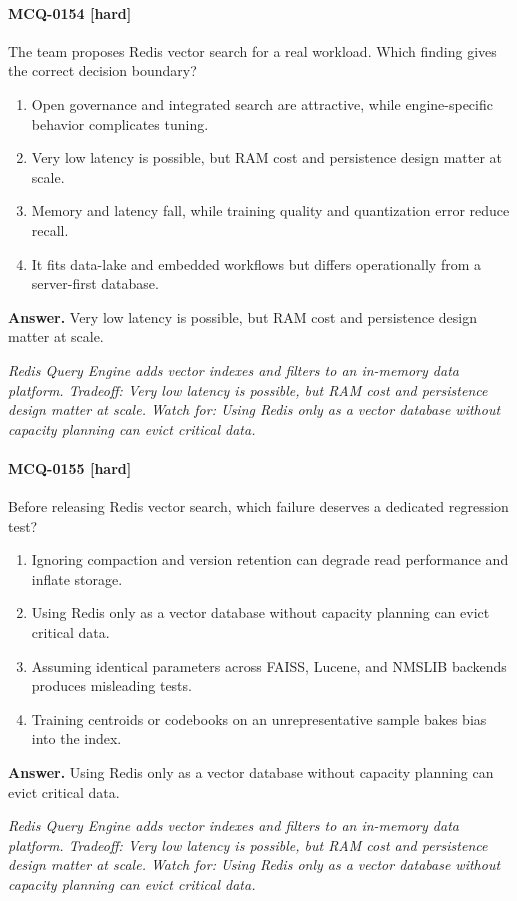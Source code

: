 \paragraph{MCQ-0154 [hard]} The team proposes Redis vector search for a real workload. Which finding gives the correct decision boundary?
\begin{enumerate}[label=\Alph*.]
\item Open governance and integrated search are attractive, while engine-specific behavior complicates tuning.
\item Very low latency is possible, but RAM cost and persistence design matter at scale.
\item Memory and latency fall, while training quality and quantization error reduce recall.
\item It fits data-lake and embedded workflows but differs operationally from a server-first database.
\end{enumerate}
\noindent\textbf{Answer.} Very low latency is possible, but RAM cost and persistence design matter at scale.
\par\textit{Redis Query Engine adds vector indexes and filters to an in-memory data platform. Tradeoff: Very low latency is possible, but RAM cost and persistence design matter at scale. Watch for: Using Redis only as a vector database without capacity planning can evict critical data.}
\paragraph{MCQ-0155 [hard]} Before releasing Redis vector search, which failure deserves a dedicated regression test?
\begin{enumerate}[label=\Alph*.]
\item Ignoring compaction and version retention can degrade read performance and inflate storage.
\item Using Redis only as a vector database without capacity planning can evict critical data.
\item Assuming identical parameters across FAISS, Lucene, and NMSLIB backends produces misleading tests.
\item Training centroids or codebooks on an unrepresentative sample bakes bias into the index.
\end{enumerate}
\noindent\textbf{Answer.} Using Redis only as a vector database without capacity planning can evict critical data.
\par\textit{Redis Query Engine adds vector indexes and filters to an in-memory data platform. Tradeoff: Very low latency is possible, but RAM cost and persistence design matter at scale. Watch for: Using Redis only as a vector database without capacity planning can evict critical data.}
